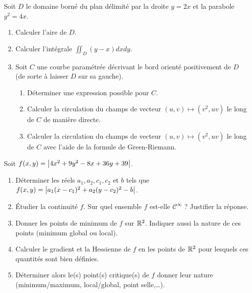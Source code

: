 \documentclass{article}
\begin{document}
\bigskip

\exo{} Soit $D$ le domaine borné du plan délimité par la droite $y=2x$ et la parabole $y^2= 4x$.
\begin{enumerate}
\item Calculer l'aire de $D$.
\item Calculer l'intégrale $\iint_D (y-x) dxdy$.
\item Soit $C$ une courbe paramétrée décrivant le bord orienté positivement de $D$ (\ie de sorte à laisser $D$ sur sa gauche). 
	\begin{enumerate}
		\item Déterminer une expression possible pour $C$.
		\item Calculer la circulation du champs de vecteur $(u,v) \mapsto (v^2,uv)$ le long de $C$ de manière directe.
		\item Calculer la circulation du champs de vecteur $(u,v) \mapsto (v^2,uv)$ le long de $C$ avec l'aide de la formule de Green-Riemann.
	\end{enumerate}
\end{enumerate}

\bigskip


\exo{} Soit $f(x,y) = \left\lvert4x^2 + 9y^2 - 8x + 36y + 39\right\rvert$.%
\begin{enumerate}
	\item Déterminer les réels $a_1,a_2,c_1,c_2$ et $b$ tels que $f(x , y) = \left\lvert a_1(x-c_1)^2 + a_2 (y-c_2)^2 -b\right\rvert$. %
	\item \'Etudier la continuité $f$. Sur quel ensemble $f$ est-elle $\mathcal C^\infty$ ? Justifier la réponse.
	\item Donner les points de minimum de $f$ sur $\mathbb{R}^2$. Indiquer aussi la nature de ces points (minimum global ou local).
	\item Calculer le gradient et la Hessienne de $f$ en les points de $\mathbb{R}^2$ pour lesquels ces quantités sont bien définies.
	\item Déterminer alors le(s) point(s) critique(s) de $f$ donner leur nature (minimum/maximum, local/global, point selle,\ldots).
\end{enumerate}


\bigskip


\end{document}
